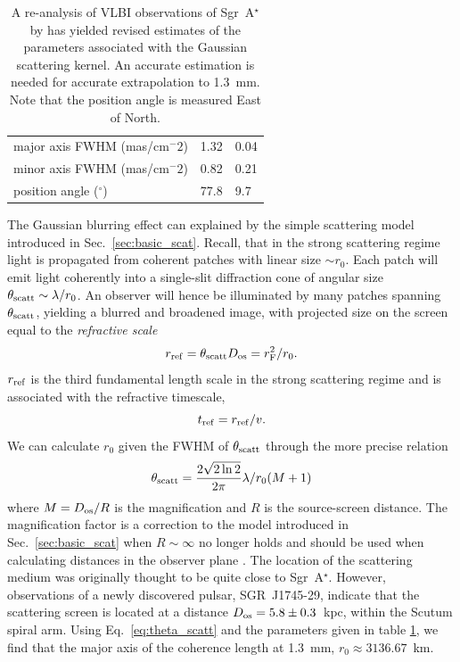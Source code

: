 \begin{table}[]
\centering
\caption{A re-analysis of VLBI observations of Sgr~A$^\star$ by \citet{Psaltis_2015} has yielded revised estimates of the parameters associated with the Gaussian scattering kernel. An accurate estimation is needed for accurate extrapolation to 1.3~mm. Note that the position angle is measured East of North. \label{tab:ism_gauss}}
\begin{tabular}{l|ll}
\hline
major axis FWHM (mas/cm$^-2$)& 1.32 & 0.04 \\
minor axis FWHM (mas/cm$^-2$)& 0.82 & 0.21 \\
position angle ($^\circ$)& 77.8 & 9.7\\  
\hline
\end{tabular}
\end{table}


The Gaussian blurring effect can explained by the simple scattering model introduced in  Sec.~\ref{sec:basic_scat}. Recall, that in the strong scattering regime light is propagated from coherent patches with linear size $\sim r_0$. Each patch will emit light coherently into a single-slit diffraction cone of angular size $\theta_{\rm scatt} \sim \lambda /r_0$. An observer will hence be illuminated by many patches spanning $\theta_{\rm scatt}$, yielding a blurred and broadened image, with projected size on the screen equal to the \emph{refractive scale} 
$$r_{\rm ref} = \theta_{\rm scatt} D_{\rm os} = r_{\rm F}^2/r_0.$$
$r_{\rm ref}$ is the third fundamental length scale in the strong scattering regime and is associated with the refractive timescale,
$$t_{\rm ref} = r_{\rm ref}/v.$$
We can calculate $r_0$ given the FWHM of $\theta_{\rm scatt}$ through the more precise relation
\begin{equation}\label{eq:theta_scatt}
 \theta_{\rm scatt} = \frac{2\sqrt{2\ln{2}}}{2\pi} \lambda / r_0 (M+1)
\end{equation} 
where $M = D_{\rm os}/R$ is the magnification and $R$ is the source-screen distance. The magnification factor is a correction to the model introduced in Sec.~\ref{sec:basic_scat} when $R \sim \infty$ no longer holds and should be used when calculating distances in the observer plane \citep*{Goodman_1989}.
The location of the scattering medium was originally thought to be quite close to Sgr~A$^\star$. However, observations of a newly discovered pulsar, SGR~J1745-29, indicate that the scattering screen is located at a distance $D_{\rm os} = 5.8 \pm 0.3$~kpc, within the Scutum spiral arm. Using Eq.~\ref{eq:theta_scatt} and the parameters given in table \ref{tab:ism_gauss}, we find that the major axis of the coherence length at 1.3~mm, $r_0 \approx 3136.67$~km.


